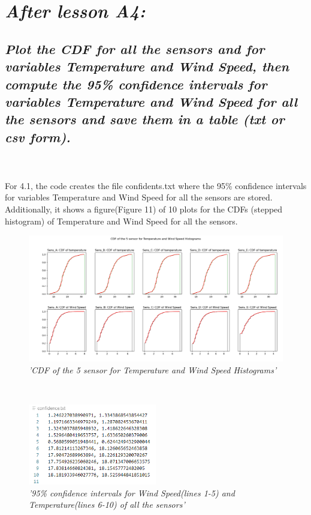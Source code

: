 \documentclass[a4paper,12pt]{article} %
\begin{document}
\section{\it After lesson A4:}
\subsection{\it Plot the CDF for all the sensors and for variables Temperature and Wind Speed, then compute the 95\% confidence intervals for variables Temperature and Wind Speed for all the sensors and save them in a table (txt or csv form).}
\\\\ 
For 4.1, the code creates the file confidents.txt where the 95\% 
confidence intervals for variables Temperature and Wind Speed 
for all the sensors are stored. Additionally, it shows a 
figure(Figure 11) of 10 plots for the CDFs (stepped histogram) of Temperature and Wind Speed for all the sensors.
\\
\begin{figure}[H]
\centering
\includegraphics[width=\textwidth]{Graphs/CDF_of_the_5_sensor_-_Temperature,_Wind_Speed.png}
\caption{\it'CDF of the 5 sensor for Temperature and Wind Speed Histograms'}
\end{figure}
\\
\begin{figure}[H]
    \centering
    \includegraphics[width=0.5\textwidth]{Graphs/Confidence_95perc_Temp_WS.PNG}
    \caption{\it'95\% confidence intervals for Wind Speed(lines 1-5) and Temperature(lines 6-10) of all the sensors'}
    \end{figure}
\\\\
\end{document}
